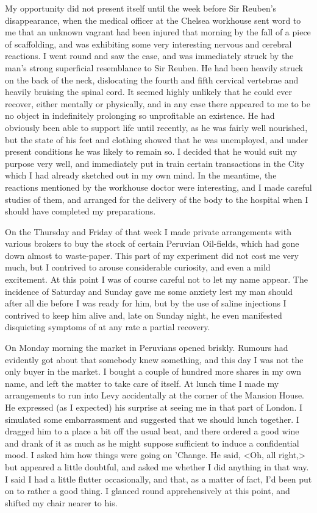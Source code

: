 My opportunity did not present itself until the week before Sir Reuben's disappearance, when the medical officer at the Chelsea workhouse sent word to me that an unknown vagrant had been injured that morning by the fall of a piece of scaffolding, and was exhibiting some very interesting nervous and cerebral reactions. I went round and saw the case, and was immediately struck by the man's strong superficial resemblance to Sir Reuben. He had been heavily struck on the back of the neck, dislocating the fourth and fifth cervical vertebrae and heavily bruising the spinal cord. It seemed highly unlikely that he could ever recover, either mentally or physically, and in any case there appeared to me to be no object in indefinitely prolonging so unprofitable an existence. He had obviously been able to support life until recently, as he was fairly well nourished, but the state of his feet and clothing showed that he was unemployed, and under present conditions he was likely to remain so. I decided that he would suit my purpose very well, and immediately put in train certain transactions in the City which I had already sketched out in my own mind. In the meantime, the reactions mentioned by the workhouse doctor were interesting, and I made careful studies of them, and arranged for the delivery of the body to the hospital when I should have completed my preparations.

On the Thursday and Friday of that week I made private arrangements with various brokers to buy the stock of certain Peruvian Oil-fields, which had gone down almost to waste-paper. This part of my experiment did not cost me very much, but I contrived to arouse considerable curiosity, and even a mild excitement. At this point I was of course careful not to let my name appear. The incidence of Saturday and Sunday gave me some anxiety lest my man should after all die before I was ready for him, but by the use of saline injections I contrived to keep him alive and, late on Sunday night, he even manifested disquieting symptoms of at any rate a partial recovery.

On Monday morning the market in Peruvians opened briskly. Rumours had evidently got about that somebody knew something, and this day I was not the only buyer in the market. I bought a couple of hundred more shares in my own name, and left the matter to take care of itself. At lunch time I made my arrangements to run into Levy accidentally at the corner of the Mansion House. He expressed (as I expected) his surprise at seeing me in that part of London. I simulated some embarrassment and suggested that we should lunch together. I dragged him to a place a bit off the usual beat, and there ordered a good wine and drank of it as much as he might suppose sufficient to induce a confidential mood. I asked him how things were going on 'Change. He said, <Oh, all right,> but appeared a little doubtful, and asked me whether I did anything in that way. I said I had a little flutter occasionally, and that, as a matter of fact, I'd been put on to rather a good thing. I glanced round apprehensively at this point, and shifted my chair nearer to his.

